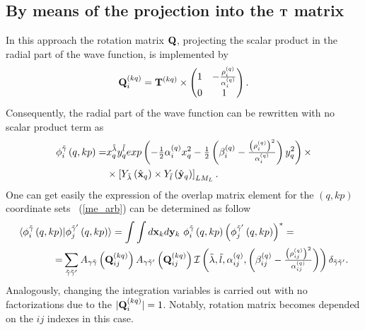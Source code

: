 \documentclass[
12pt, %
oneside, %
english, %
onehalfspacing, %
onehalfspacing, %
headsepline, %
]{MastersDoctoralThesis} %
\begin{document}
\subsection{By means of the projection into the ${\bf T}$ matrix}
\label{overlap_by_proj}
In this approach the rotation matrix ${\bf Q}$, projecting the scalar product in the radial part of the wave function, is implemented by
\begin{equation}
{\bf Q}_i^{(kq)}= {\bf T}^{(kq)} \times
\begin{pmatrix}
1 & -\tfrac{\rho^{(q)}_{i}}{\alpha^{(q)}_i} \\ 
0 & 1
\end{pmatrix} .
\end{equation}
Consequently, the radial part of the wave function can be rewritten with no scalar product term as
\begin{align}
\phi_{i}^{\tilde{\gamma} } \left(q, kp \right)  =  &
 x_{q}^{\tilde{\lambda}} y_{q}^{\tilde{l}} exp\left(- \tfrac{1}{2} \alpha^{(q)}_{i} x_{q}^{2} - \tfrac{1}{2} \left(  \beta^{(q)}_{i} - \tfrac{\left(\rho^{(q)}_i\right)^2}{\alpha^{(q)}_i} \right)  y_{q}^{2}  \right) 
\times  \nonumber \\ 
&\times  \left[ Y_{\tilde{\lambda}} \left(  \hat{ \bf x}_q \right) \times Y_{\tilde{l}} \left( \hat{\bf y}_q \right) \right]_{LM_L}.
\end{align}
One can get easily the expression of the overlap matrix element for the $(q,kp)$ coordinate sets ~(\ref{me_arb}) can be determined as follow
\begin{align}
\langle \phi_{i}^{\tilde{\gamma}}\left(q,kp \right) & \vert 
\phi_{j}^{\tilde{\gamma}^{\prime}}\left(q,kp \right) \rangle =
\int \int d{\bf x}_k d{\bf y}_k  ~\phi_{i}^{\tilde{\gamma}}\left(q,kp \right) \left( \phi_{j}^{\tilde{\gamma}^{\prime}}\left(q,kp \right) \right)^{*} =  \nonumber \\
=& \sum_{\tilde{\gamma}\tilde{\gamma}^{\prime}}  
A_{\gamma\tilde{\gamma}}\left( {\bf Q}_{ij}^{(kq)} \right)
 A_{\gamma\tilde{\gamma}^{\prime}}\left( {\bf Q}_{ij}^{(kq)} \right) \mathcal{I} \left( \tilde{\lambda}, \tilde{l}, \alpha^{(q)}_{ij}, \left(  \beta^{(q)}_{ij} - \tfrac{\left(\rho^{(q)}_{ij}\right)^2}{\alpha^{(q)}_{ij}} \right) \right) \delta_{\tilde{\gamma}\tilde{\gamma}^{\prime}}.
 \label{projectionMethod}
\end{align}
Analogously, changing the integration variables is carried out with no factorizations due to the $\vert {\bf Q}_i^{(kq)} \vert = 1$. Notably,   rotation matrix becomes depended on the $ij$ indexes in this case.
\end{document}
